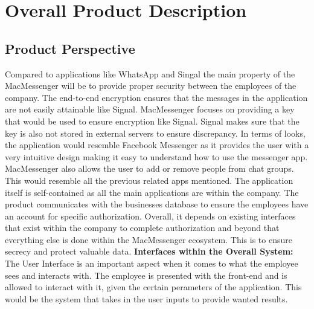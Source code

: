 \documentclass[]{article}
\begin{document}

\section{Overall Product Description}
\label{sec:overall_description}

\subsection{Product Perspective}
\label{sub:product_perspective}
\hspace{5mm}Compared to applications like WhatsApp and Singal the main property of the MacMessenger will be to provide proper security between the employees of the company. The end-to-end encryption ensures that the messages in the application are not easily attainable like Signal. MacMessenger focuses on providing a key that would be used to ensure encryption like Signal. Signal makes sure that the key is also not stored in external servers to ensure discrepancy. In terms of looks, the application would resemble Facebook Messenger as it provides the user with a very intuitive design making it easy to understand how to use the messenger app. MacMessenger also allows the user to add or remove people from chat groups. This would resemble all the previous related apps mentioned.
\newline
\newline
\indent The application itself is self-contained as all the main applications are within the company. The product communicates with the businesses database to ensure the employees have an account for specific authorization. Overall, it depends on existing interfaces that exist within the company to complete authorization and beyond that everything else is done within the MacMessenger ecosystem. This is to ensure secrecy and protect valuable data.
\newline
\newline
\textbf{Interfaces within the Overall System:}
\newline
\newline
\indent The User Interface is an important aspect when it comes to what the employee sees and interacts with. The employee is presented with the front-end and is allowed to interact with it, given the certain perameters of the application. This would be the system that takes in the user inputs to provide wanted results.
\newline
\newline
\end{document}
